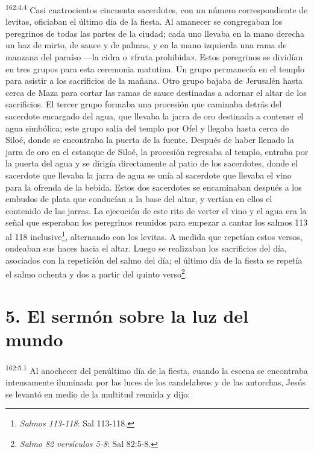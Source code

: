 \par 
\textsuperscript{162:4.4} Casi cuatrocientos cincuenta sacerdotes, con un número correspondiente de levitas, oficiaban el último día de la fiesta. Al amanecer se congregaban los peregrinos de todas las partes de la ciudad; cada uno llevaba en la mano derecha un haz de mirto, de sauce y de palmas, y en la mano izquierda una rama de manzana del paraíso ---la cidra o «fruta prohibida». Estos peregrinos se dividían en tres grupos para esta ceremonia matutina. Un grupo permanecía en el templo para asistir a los sacrificios de la mañana. Otro grupo bajaba de Jerusalén hasta cerca de Maza para cortar las ramas de sauce destinadas a adornar el altar de los sacrificios. El tercer grupo formaba una procesión que caminaba detrás del sacerdote encargado del agua, que llevaba la jarra de oro destinada a contener el agua simbólica; este grupo salía del templo por Ofel y llegaba hasta cerca de Siloé, donde se encontraba la puerta de la fuente. Después de haber llenado la jarra de oro en el estanque de Siloé, la procesión regresaba al templo, entraba por la puerta del agua y se dirigía directamente al patio de los sacerdotes, donde el sacerdote que llevaba la jarra de agua se unía al sacerdote que llevaba el vino para la ofrenda de la bebida. Estos dos sacerdotes se encaminaban después a los embudos de plata que conducían a la base del altar, y vertían en ellos el contenido de las jarras. La ejecución de este rito de verter el vino y el agua era la señal que esperaban los peregrinos reunidos para empezar a cantar los salmos 113 al 118 inclusive\footnote{\textit{Salmos 113-118}: Sal 113-118.}, alternando con los levitas. A medida que repetían estos versos, ondeaban sus haces hacia el altar. Luego se realizaban los sacrificios del día, asociados con la repetición del salmo del día; el último día de la fiesta se repetía el salmo ochenta y dos a partir del quinto verso\footnote{\textit{Salmo 82 versículos 5-8}: Sal 82:5-8.}.

\section*{5. El sermón sobre la luz del mundo}
\par 
\textsuperscript{162:5.1} Al anochecer del penúltimo día de la fiesta, cuando la escena se encontraba intensamente iluminada por las luces de los candelabros y de las antorchas, Jesús se levantó en medio de la multitud reunida y dijo:

